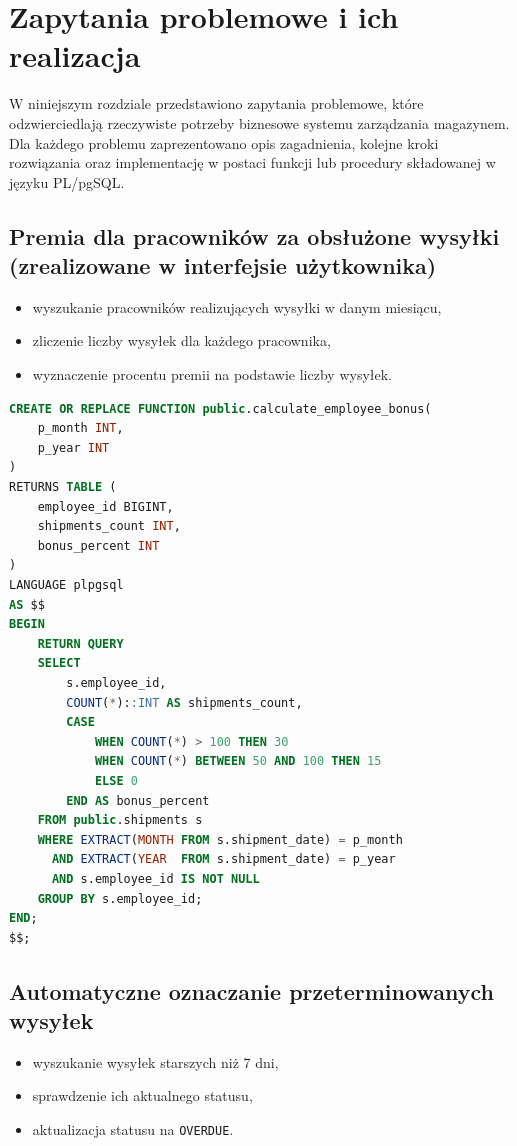 \chapter{Zapytania problemowe i ich realizacja}

W niniejszym rozdziale przedstawiono zapytania problemowe,
które odzwierciedlają rzeczywiste potrzeby biznesowe systemu
zarządzania magazynem. Dla każdego problemu zaprezentowano
opis zagadnienia, kolejne kroki rozwiązania oraz implementację
w postaci funkcji lub procedury składowanej w języku PL/pgSQL.

\section{Premia dla pracowników za obsłużone wysyłki (zrealizowane w interfejsie użytkownika)}
\begin{itemize}
    \item wyszukanie pracowników realizujących wysyłki w danym miesiącu,
    \item zliczenie liczby wysyłek dla każdego pracownika,
    \item wyznaczenie procentu premii na podstawie liczby wysyłek.
\end{itemize}

\begin{lstlisting}[language=SQL, caption={Funkcja obliczająca premię pracownika}]
CREATE OR REPLACE FUNCTION public.calculate_employee_bonus(
    p_month INT,
    p_year INT
)
RETURNS TABLE (
    employee_id BIGINT,
    shipments_count INT,
    bonus_percent INT
)
LANGUAGE plpgsql
AS $$
BEGIN
    RETURN QUERY
    SELECT
        s.employee_id,
        COUNT(*)::INT AS shipments_count,
        CASE
            WHEN COUNT(*) > 100 THEN 30
            WHEN COUNT(*) BETWEEN 50 AND 100 THEN 15
            ELSE 0
        END AS bonus_percent
    FROM public.shipments s
    WHERE EXTRACT(MONTH FROM s.shipment_date) = p_month
      AND EXTRACT(YEAR  FROM s.shipment_date) = p_year
      AND s.employee_id IS NOT NULL
    GROUP BY s.employee_id;
END;
$$;
\end{lstlisting}

\section{Automatyczne oznaczanie przeterminowanych wysyłek}
\begin{itemize}
    \item wyszukanie wysyłek starszych niż 7 dni,
    \item sprawdzenie ich aktualnego statusu,
    \item aktualizacja statusu na \texttt{OVERDUE}.
\end{itemize}

